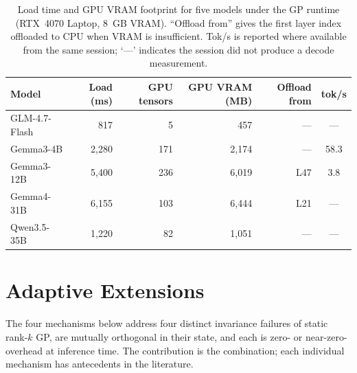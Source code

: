 \documentclass[11pt]{article}
\begin{document}
\begin{table}[h]\centering\small
\caption{Load time and GPU VRAM footprint for five models under the GP
runtime (RTX~4070 Laptop, 8~GB VRAM).  ``Offload from'' gives the
first layer index offloaded to CPU when VRAM is insufficient.
Tok/s is reported where available from the same session; `---'
indicates the session did not produce a decode measurement.}
\label{tab:load-vram}
\begin{tabular}{@{}lrrrrc@{}}
\toprule
Model & Load (ms) & GPU tensors & GPU VRAM (MB) & Offload from & tok/s \\
\midrule
GLM-4.7-Flash          & 817   & 5   & 457   & ---  & --- \\
Gemma3-4B              & 2{,}280 & 171 & 2{,}174 & ---  & 58.3 \\
Gemma3-12B             & 5{,}400 & 236 & 6{,}019 & L47  & 3.8  \\
Gemma4-31B             & 6{,}155 & 103 & 6{,}444 & L21  & --- \\
Qwen3.5-35B            & 1{,}220 & 82  & 1{,}051 & ---  & --- \\
\bottomrule
\end{tabular}
\end{table}

\section*{Adaptive Extensions}

The four mechanisms below address four distinct invariance failures of
static rank-$k$ GP, are mutually orthogonal in their state, and each is
zero- or near-zero-overhead at inference time.  The contribution is the
combination; each individual mechanism has antecedents in the
literature.
\end{document}
